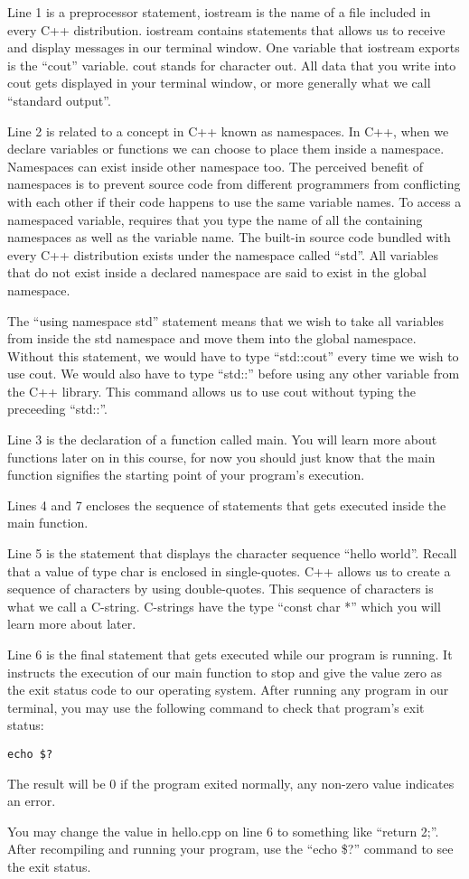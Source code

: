 \documentclass[a4paper,12pt]{article}
\begin{document}
Line 1 is a preprocessor statement, iostream is the name of a file included in every C++ distribution. iostream contains statements that allows us to receive and display messages in our terminal window. One variable that iostream exports is the ``cout'' variable. cout stands for character out. All data that you write into cout gets displayed in your terminal window, or more generally what we call ``standard output''. 

Line 2 is related to a concept in C++ known as namespaces. In C++, when we declare variables or functions we can choose to place them inside a namespace. Namespaces can exist inside other namespace too. The perceived benefit of namespaces is to prevent source code from different programmers from conflicting with each other if their code happens to use the same variable names. To access a namespaced variable, requires that you type the name of all the containing namespaces as well as the variable name. The built-in source code bundled with every C++ distribution exists under the namespace called ``std''. All variables that do not exist inside a declared namespace are said to exist in the global namespace. 

The ``using namespace std'' statement means that we wish to take all variables from inside the std namespace and move them into the global namespace. Without this statement, we would have to type ``std::cout'' every time we wish to use cout. We would also have to type ``std::'' before using any other variable from the C++ library. This command allows us to use cout without typing the preceeding ``std::''.

Line 3 is the declaration of a function called main. You will learn more about functions later on in this course, for now you should just know that the main function signifies the starting point of your program's execution. 

Lines 4 and 7 encloses the sequence of statements that gets executed inside the main function.

Line 5 is the statement that displays the character sequence ``hello world''. Recall that a value of type char is enclosed in single-quotes. C++ allows us to create a sequence of characters by using double-quotes. This sequence of characters is what we call a C-string. C-strings have the type ``const char *'' which you will learn more about later.

Line 6 is the final statement that gets executed while our program is running. It instructs the execution of our main function to stop and give the value zero as the exit status code to our operating system. After running any program in our terminal, you may use the following command to check that program's exit status:

\lstset{numbers=none}
\begin{lstlisting}
echo $?
\end{lstlisting}

The result will be 0 if the program exited normally, any non-zero value indicates an error.

You may change the value in hello.cpp on line 6 to something like ``return 2;''. After recompiling and running your program, use the ``echo \$?'' command to see the exit status.
\end{document}

